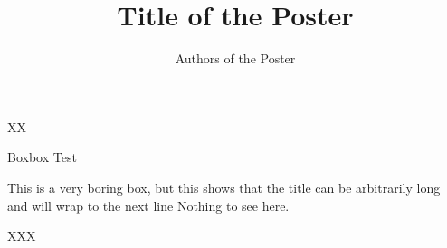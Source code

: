\documentclass[a3,2col]{ostposter}
\title{Title of the Poster}
\author{Authors of the Poster}
\affiliation{Division..., Department..., University..., etc.}
\begin{document}
\begin{postercolumn}
	\begin{posterbox}[posterblue]{XX}
		\lipsum[1]
	\end{posterbox}
	\begin{posterbox}[posteryellow]{Boxbox}
		Test
	\end{posterbox}
	\begin{posterbox}[posterorange]{This is a very boring box, but this shows that the title can be arbitrarily long and will wrap to the next line}
		Nothing to see here.
	\end{posterbox}
	\begin{posterbox}{XXX}
		\lipsum[2-3]
	\end{posterbox}
\end{postercolumn}
\end{document}
